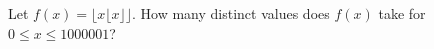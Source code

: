 Let $f(x)=\lfloor x\lfloor x\rfloor\rfloor$. How many distinct values does $f(x)$ take for $0\le x\le1000001$?
